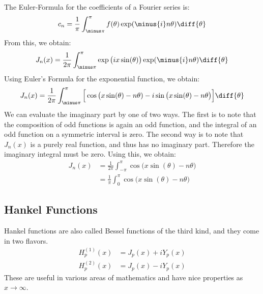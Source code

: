             The Euler-Formula for the coefficients of a Fourier
            series is:
            \begin{equation}
                c_{n}=\frac{1}{\pi}\int_{\minus\pi}^{\pi}
                    f(\theta)\exp(\minus{i}n\theta)\diff{\theta}
            \end{equation}
            From this, we obtain:
            \begin{equation}
                J_{n}(x)=\frac{1}{2\pi}
                    \int_{\minus\pi}^{\pi}
                    \exp\big(ix\sin(\theta)\big)
                    \exp(\minus{i}n\theta)\diff{\theta}
            \end{equation}
            Using Euler's Formula for the exponential function,
            we obtain:
            \begin{equation}
                J_{n}(x)=\frac{1}{2\pi}
                \int_{\minus\pi}^{\pi}\Big[
                    \cos\big(x\sin(\theta)-n\theta)-
                    i\sin\big(x\sin(\theta)-n\theta\big)\Big]
                    \diff{\theta}
            \end{equation}
            We can evaluate the imaginary part by one of two ways.
            The first is to note that the composition of odd
            functions is again an odd function, and the integral
            of an odd function on a symmetric interval is zero.
            The second way is to note that $J_{n}(x)$ is a purely
            real function, and thus has no imaginary part. Therefore
            the imaginary integral must be zero. Using this, we
            obtain:
            \begin{align}
                J_{n}(x)&=\frac{1}{2\pi}\int_{\minus\pi}^{\pi}
                    \cos\big(x\sin(\theta)-n\theta\big)\\
                &=\frac{1}{\pi}\int_{0}^{\pi}
                    \cos\big(x\sin(\theta)-n\theta\big)
            \end{align}
        \subsection{Hankel Functions}
            Hankel functions are also called Bessel functions
            of the third kind, and they come in two flavors.
            \begin{align}
                H_{p}^{(1)}(x)
                    &=J_{p}(x)+iY_{p}(x)\\
                H_{p}^{(2)}(x)&=J_{p}(x)-iY_{p}(x)
            \end{align}
            These are useful in various areas of mathematics and
            have nice properties as $x\rightarrow\infty$.
